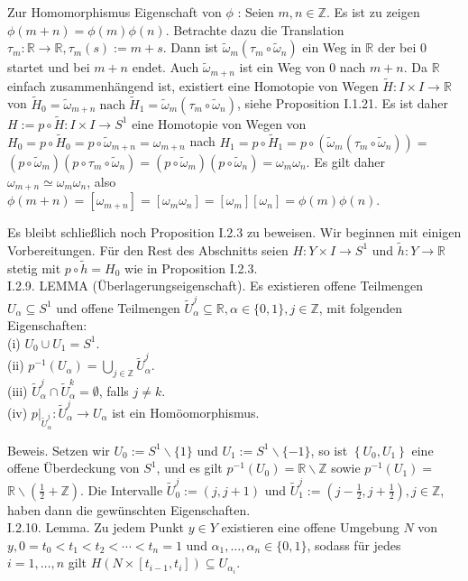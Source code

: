 \documentclass[10pt, letterpaper]{article}
\begin{document}
Zur Homomorphismus Eigenschaft von $\phi$ : Seien $m, n \in \mathbb{Z}$. Es ist zu zeigen $\phi(m+n)=\phi(m) \phi(n)$. Betrachte dazu die Translation $\tau_{m}: \mathbb{R} \rightarrow \mathbb{R}, \tau_{m}(s):=m+s$. Dann ist $\tilde{\omega}_{m}\left(\tau_{m} \circ \tilde{\omega}_{n}\right)$ ein Weg in $\mathbb{R}$ der bei 0 startet und bei $m+n$ endet. Auch $\tilde{\omega}_{m+n}$ ist ein Weg von 0 nach $m+n$. Da $\mathbb{R}$ einfach zusammenhängend ist, existiert eine Homotopie von Wegen $\tilde{H}: I \times I \rightarrow \mathbb{R}$ von $\tilde{H}_{0}=\tilde{\omega}_{m+n} \operatorname{nach} \tilde{H}_{1}=\tilde{\omega}_{m}\left(\tau_{m} \circ \tilde{\omega}_{n}\right)$, siehe Proposition I.1.21. Es ist daher $H:=p \circ \tilde{H}: I \times I \rightarrow S^{1}$ eine Homotopie von Wegen von $H_{0}=p \circ \tilde{H}_{0}=p \circ \tilde{\omega}_{m+n}=\omega_{m+n}$ nach $H_{1}=p \circ \tilde{H}_{1}=p \circ\left(\tilde{\omega}_{m}\left(\tau_{m} \circ \tilde{\omega}_{n}\right)\right)=$ $\left(p \circ \tilde{\omega}_{m}\right)\left(p \circ \tau_{m} \circ \tilde{\omega}_{n}\right)=\left(p \circ \tilde{\omega}_{m}\right)\left(p \circ \tilde{\omega}_{n}\right)=\omega_{m} \omega_{n}$. Es gilt daher $\omega_{m+n} \simeq \omega_{m} \omega_{n}$, also $\phi(m+n)=\left[\omega_{m+n}\right]=\left[\omega_{m} \omega_{n}\right]=\left[\omega_{m}\right]\left[\omega_{n}\right]=\phi(m) \phi(n)$.

Es bleibt schließlich noch Proposition I.2.3 zu beweisen. Wir beginnen mit einigen Vorbereitungen. Für den Rest des Abschnitts seien $H: Y \times I \rightarrow S^{1}$ und $\tilde{h}: Y \rightarrow \mathbb{R}$ stetig mit $p \circ \tilde{h}=H_{0}$ wie in Proposition I.2.3.\\
I.2.9. LEMMA (Überlagerungseigenschaft). Es existieren offene Teilmengen $U_{\alpha} \subseteq S^{1}$ und offene Teilmengen $\tilde{U}_{\alpha}^{j} \subseteq \mathbb{R}, \alpha \in\{0,1\}, j \in \mathbb{Z}$, mit folgenden Eigenschaften:\\
(i) $U_{0} \cup U_{1}=S^{1}$.\\
(ii) $p^{-1}\left(U_{\alpha}\right)=\bigcup_{j \in \mathbb{Z}} \tilde{U}_{\alpha}^{j}$.\\
(iii) $\tilde{U}_{\alpha}^{j} \cap \tilde{U}_{\alpha}^{k}=\emptyset$, falls $j \neq k$.\\
(iv) $\left.p\right|_{\tilde{U}_{\alpha}^{j}}: \tilde{U}_{\alpha}^{j} \rightarrow U_{\alpha}$ ist ein Homöomorphismus.

Beweis. Setzen wir $U_{0}:=S^{1} \backslash\{1\}$ und $U_{1}:=S^{1} \backslash\{-1\}$, so ist $\left\{U_{0}, U_{1}\right\}$ eine offene Überdeckung von $S^{1}$, und es gilt $p^{-1}\left(U_{0}\right)=\mathbb{R} \backslash \mathbb{Z}$ sowie $p^{-1}\left(U_{1}\right)=$ $\mathbb{R} \backslash\left(\frac{1}{2}+\mathbb{Z}\right)$. Die Intervalle $\tilde{U}_{0}^{j}:=(j, j+1)$ und $\tilde{U}_{1}^{j}:=\left(j-\frac{1}{2}, j+\frac{1}{2}\right), j \in \mathbb{Z}$, haben dann die gewünschten Eigenschaften.\\
I.2.10. Lemma. Zu jedem Punkt $y \in Y$ existieren eine offene Umgebung $N$ von $y, 0=t_{0}<t_{1}<t_{2}<\cdots<t_{n}=1$ und $\alpha_{1}, \ldots, \alpha_{n} \in\{0,1\}$, sodass für jedes $i=1, \ldots, n$ gilt $H\left(N \times\left[t_{i-1}, t_{i}\right]\right) \subseteq U_{\alpha_{i}}$.
\end{document}

